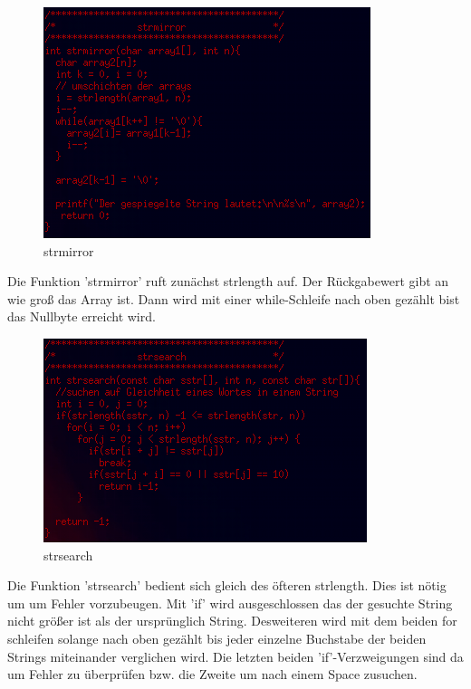 \documentclass{scrartcl}
\begin{document}
\begin{figure}[H]
  \centering
  \includegraphics[width=0.9\linewidth]{images/strmirror.png}
  \caption{strmirror}
  \label{fig:digraph}
\end{figure}
Die Funktion 'strmirror' ruft zunächst strlength auf. Der Rückgabewert gibt an wie groß das Array ist. Dann wird mit einer while-Schleife nach oben gezählt bist das Nullbyte erreicht wird.

\begin{figure}[H]
  \centering
  \includegraphics[width=0.9\linewidth]{images/strsearch.png}
  \caption{strsearch}
  \label{fig:digraph}
\end{figure}
Die Funktion 'strsearch' bedient sich gleich des öfteren strlength. Dies ist nötig um um Fehler vorzubeugen. Mit 'if' wird ausgeschlossen das der gesuchte String nicht größer ist als der ursprünglich String. Desweiteren wird mit dem beiden for schleifen solange nach oben gezählt bis jeder einzelne Buchstabe der beiden Strings miteinander verglichen wird. Die letzten beiden 'if'-Verzweigungen sind da um Fehler zu überprüfen bzw. die Zweite um nach einem Space zusuchen.
\end{document}
